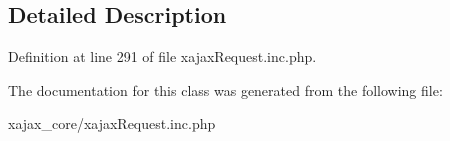 \subsection{Detailed Description}


Definition at line 291 of file xajaxRequest.inc.php.



The documentation for this class was generated from the following file:\begin{DoxyCompactItemize}
\item 
xajax\_\-core/xajaxRequest.inc.php\end{DoxyCompactItemize}
